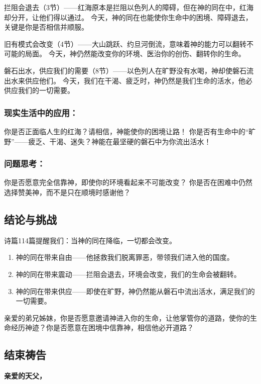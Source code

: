 \documentclass[a4paper, 12pt]{article}
\begin{document}
\hspace{0.6cm}拦阻会退去（3节）——红海原本是拦阻以色列人的障碍，但在神的同在中，红海却分开，让他们得以通过。
今天，神的同在也能使你生命中的困境、障碍退去，关键是你是否相信并顺服。

旧有模式会改变（4节）——大山跳跃、约旦河倒流，意味着神的能力可以翻转不可能的局面。
今天，神仍然能改变你的环境、医治你的创伤、翻转你的生命。

磐石出水，供应我们的需要（8节）——以色列人在旷野没有水喝，神却使磐石流出水来供应他们。
今天，我们在干渴、疲乏时，神仍然是我们生命的活水，他必供应我们的一切需要。

\subsubsection*{现实生活中的应用：}

你是否正面临人生的红海？请相信，神能使你的困境让路！
你是否有生命中的“旷野”——疲乏、干渴、迷失？神能在最坚硬的磐石中为你流出活水！
\subsubsection*{问题思考：}

你是否愿意完全信靠神，即使你的环境看起来不可能改变？
你是否在困难中仍然选择赞美神，而不是只在顺境时感谢他？
\subsection*{结论与挑战}
诗篇114篇提醒我们：当神的同在降临，一切都会改变。
\begin{enumerate}
    \item 神的同在带来自由——他拯救我们脱离罪恶，带领我们进入他的国度。

    \item 神的同在带来震动——拦阻会退去，环境会改变，我们的生命会被翻转。

    \item 神的同在带来供应——即使在旷野，神仍然能从磐石中流出活水，满足我们的一切需要。

\end{enumerate}

亲爱的弟兄姊妹，你是否愿意邀请神进入你的生命，让他掌管你的道路，使你的生命经历神迹？你是否愿意在困境中信靠神，相信他必开道路？

\subsection*{结束祷告}
\textbf{亲爱的天父，}
\end{document}
